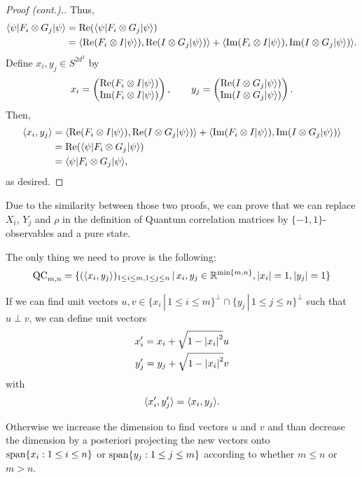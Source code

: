 	\begin{frame}
		\begin{proof}[Proof (cont.).]
			Thus,
			\begin{align*}
				\langle {\psi} \vert F_i\otimes G_j \vert {\psi} \rangle &=\operatorname{Re}(\langle {\psi} \vert F_i\otimes G_j \vert {\psi} \rangle)\\
				&=\langle{\operatorname{Re}(F_i\ensuremath{\otimes}I \ensuremath{\vert {\psi} \rangle})},{\operatorname{Re}(I\otimes G_j \vert {\psi} \rangle)}\rangle+\langle{\operatorname{Im}(F_i\ensuremath{\otimes}I \ensuremath{\vert {\psi} \rangle})},{\operatorname{Im}(I\otimes G_j \vert {\psi} \rangle)}\rangle.
			\end{align*}
			\pause
			\noindent Define $x_i,y_j \in S^{2d^2}$ by
			\begin{align}
				x_i = \begin{pmatrix}
					\operatorname{Re}(F_i\otimes I \vert {\psi} \rangle) \\
					\operatorname{Im}(F_i\otimes I \vert {\psi} \rangle)
				\end{pmatrix}, \qquad
				y_j = \begin{pmatrix}
					\operatorname{Re}(I\otimes G_j \vert {\psi} \rangle)\\
					\operatorname{Im}(I\otimes G_j \vert {\psi} \rangle)
				\end{pmatrix}. 
			\end{align}
			\pause
			Then, 
			\begin{align*}
				\langle{x_i},{y_j}\rangle &= \langle{\operatorname{Re}(F_i\ensuremath{\otimes}I \ensuremath{\vert {\psi} \rangle})},{\operatorname{Re}(I\otimes G_j \vert {\psi} \rangle)}\rangle+ \langle{\operatorname{Im}(F_i\ensuremath{\otimes}I \ensuremath{\vert {\psi} \rangle})},{\operatorname{Im}(I\otimes G_j \vert {\psi} \rangle)}\rangle\\
				&= \operatorname{Re}(\langle {\psi} \vert F_i\otimes G_j \vert {\psi} \rangle) \\
				&= \langle {\psi} \vert F_i\otimes G_j \vert {\psi} \rangle,
			\end{align*}
			as desired.
		\end{proof}
	\end{frame}
	\begin{frame}
		Due to the similarity between those two proofs, we can prove that we can replace $X_i$, $Y_j$ and $\rho$ in the definition of Quantum correlation matrices by $\{-1,1\}$-observables and a pure state.
		
		The only thing we need to prove is the following: 
		\begin{equation}
			\textup{QC}_{m,n} = \{(\langle{x_i},{y_j}\rangle)_{1\leq i\leq m, 1\leq j \leq n} \,| \, x_i,y_j \in \mathbb{R}^{\min\{m,n\}}, {\left|{x_i}\right|}=1, {\left|{y_j}\right|}=1\}
		\end{equation}
	
 		If we can find unit vectors $u,v\in\{x_i\,| \, 1\leq i \leq m\}^\perp \cap \{y_j\,| \, 1\leq j \leq n\}^\perp$ such that $u\perp v$, we can define unit vectors
			\begin{align*}
				x_i^\prime = x_i + \sqrt{1-{\left|{x_i}\right|}^2}u\\
				y_j^\prime = y_j + \sqrt{1-{\left|{x_i}\right|}^2}v\\  
			\end{align*}
			with
			\[
				\langle{x_i^\prime},{y_j^\prime}\rangle = \langle{x_i},{y_j}\rangle.
			\] 
	
		Otherwise we increase the dimension to find vectors $u$ and $v$ and than decrease the dimension by a posteriori projecting the new vectors onto $\operatorname{span}\{x_i : 1\leq i \leq n\}$ or $\operatorname{span}\{y_j : 1\leq j \leq m\}$ according to whether $m\leq n$ or $m > n$.
	
	\end{frame}
